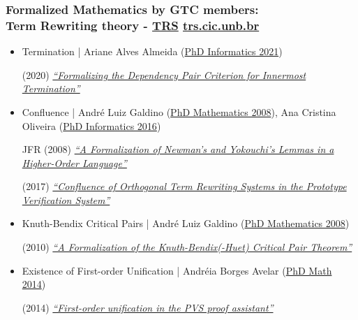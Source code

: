 \documentclass[10pt]{beamer}
\begin{document}
\begin{frame}[fragile]
  \frametitle{Formalized Mathematics by GTC members: \\
   Term
      Rewriting theory -   \href{https://github.com/nasa/pvslib/tree/master/TRS}{\color{blue} TRS}
  \hfill  \href{http://trs.cic.unb.br}{\color{blue} trs.cic.unb.br}}

{\small
  \begin{itemize}

\item Termination | Ariane Alves
  Almeida (\href{https://repositorio.unb.br/handle/10482/42296}{\color{blue}PhD Informatics 2021})

  (2020) \href{https://doi.org/10.1016/j.scico.2020.102474}{\color{blue}\scriptsize\it ``Formalizing the Dependency Pair Criterion for Innermost Termination''}    
\item Confluence |
Andr\'e Luiz Galdino (\href{https://repositorio.unb.br/handle/10482/1343}{\color{blue}PhD Mathematics  2008}), Ana Cristina Oliveira (\href{https://repositorio.unb.br/handle/10482/22387}{\color{blue}PhD
Informatics  2016})

JFR (2008) \href{https://doi.org/10.6092/issn.1972-5787/1347}{\color{blue}\scriptsize\it   ``A Formalization of Newman's and
  Yokouchi's Lemmas in a Higher-Order Language''}

 (2017) \href{https://doi.org/10.1007/s10817-016-9376-2} {\color{blue}\scriptsize\it  ``Confluence of Orthogonal Term
Rewriting Systems in the Prototype Verification System''}


\item Knuth-Bendix Critical Pairs | 
Andr\'e Luiz Galdino (\href{https://repositorio.unb.br/handle/10482/1343}{\color{blue}PhD Mathematics  2008})

 (2010)  \href{https://doi.org/10.1007/s10817-010-9165-2}{\color{blue}\scriptsize\it ``A Formalization of the
Knuth-Bendix(-Huet) Critical Pair Theorem''}

\item Existence of First-order Unification |
Andr\'eia Borges Avelar (\href{https://repositorio.unb.br/handle/10482/18069}{\color{blue}PhD Math  2014})

 (2014)  \href{https://doi.org/10.1093/jigpal/jzu012}{\color{blue}\scriptsize\it ``First-order unification in the PVS proof assistant''} 


\end{itemize}
}
\end{frame}
\end{document}
